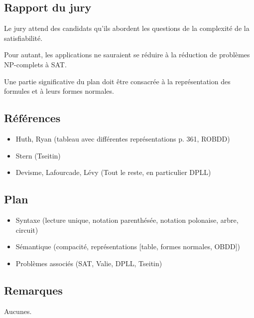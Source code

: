 \documentclass[../../agregation.tex]{subfiles}
\begin{document}

\subsection{Rapport du jury}

\begin{aquote}{}
Le jury attend des candidats qu'ils abordent les questions de la complexité de la satisfiabilité.

Pour autant, les applications ne sauraient se réduire à la réduction de problèmes NP-complets à SAT.

Une partie significative du plan doit être consacrée à la représentation des formules et à leurs formes normales.
\end{aquote}

\dvts

\subsection{Références}

\begin{itemize}
	\item Huth, Ryan (tableau avec différentes représentations p. 361, ROBDD)
	\item Stern (Tseitin)
	\item Devisme, Lafourcade, Lévy (Tout le reste, en particulier DPLL)
\end{itemize}

\subsection{Plan}

\begin{itemize}
	\item Syntaxe (lecture unique, notation parenthésée, notation polonaise, arbre, circuit)
	\item Sémantique (compacité, représentations [table, formes normales, OBDD])
	\item Problèmes associés (SAT, Valie, DPLL, Tseitin)
\end{itemize}

\subsection{Remarques}

Aucunes.
\end{document}
